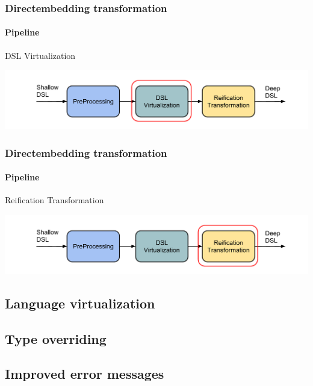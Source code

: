 \documentclass[xcolor=dvipsnames]{beamer}
\theoremstyle{definition}
\begin{document}
\begin{frame}[fragile]
    \frametitle{Directembedding transformation}
    \framesubtitle{Pipeline}
    \begin{block}{DSL Virtualization}
        
    \end{block}
    \begin{center}
        \includegraphics[width=\textwidth]{img/pipeline3.pdf}
    \end{center}
\end{frame}

\begin{frame}[fragile]
    \frametitle{Directembedding transformation}
    \framesubtitle{Pipeline}
    \begin{block}{Reification Transformation}
        
    \end{block}
    \begin{center}
        \includegraphics[width=\textwidth]{img/pipeline4.pdf}
    \end{center}
\end{frame}

\subsection{Language virtualization} %
\label{sub:Languagevirtualization}


\subsection{Type overriding} %
\label{sub:Typeoverriding}


\subsection{Improved error messages} %
\label{sub:Improvederrormessages}
\end{document}
